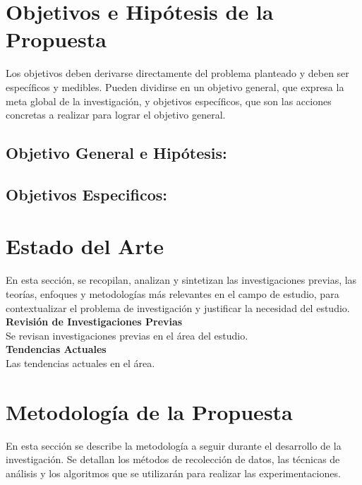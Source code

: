 \documentclass[a4paper,12pt]{article}
\begin{document}
\section{Objetivos e Hipótesis de la Propuesta}

Los objetivos deben derivarse directamente del problema planteado y deben ser específicos y medibles. Pueden dividirse en un objetivo general, que expresa la meta global de la investigación, y objetivos específicos, que son las acciones concretas a realizar para lograr el objetivo general.%


\subsection{Objetivo General e Hipótesis:}

\vspace{2cm}
\subsection{Objetivos Especificos:}



\newpage

\section{\textbf{Estado del Arte}}
En esta sección, se recopilan, analizan y sintetizan las investigaciones previas, las teorías, enfoques y metodologías más relevantes en el campo de estudio, para contextualizar el problema de investigación y justificar la necesidad del estudio. \cite{referencia2} \\
\textbf{{Revisión de Investigaciones Previas}} \\
Se revisan investigaciones previas en el área del estudio. \\
\textbf{{Tendencias Actuales}}\\
Las tendencias actuales en el área.


\newpage

\section{Metodología de la Propuesta}
En esta sección se describe la metodología a seguir durante el desarrollo de la investigación. Se detallan los métodos de recolección de datos, las técnicas de análisis y los algoritmos que se utilizarán para realizar las experimentaciones.
\cite{simpson2019largeannotatedmedicalimage}
\end{document}

